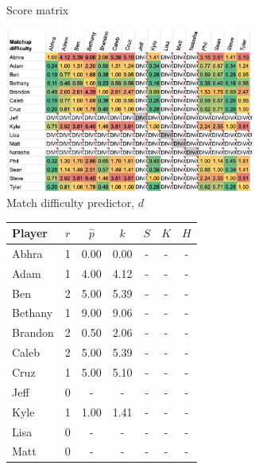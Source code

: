 \documentclass[letterpaper, 10 pt, conference]{ieeeconf}  %
\begin{document}
\begin{figure}[h!b]
\begin{subfigure}[ht]{0.4\textwidth}
                \caption{Score matrix}
        \end{subfigure}
        \begin{subfigure}[hb]{0.5\textwidth}
                \centering
                \includegraphics[width=0.9\textwidth]{fig/difficulty_3.png}
                \caption{Match difficulty predictor, $d$}
        \end{subfigure}
        \begin{subfigure}[hb]{0.4\textwidth}
                \footnotesize
                \centering
                \begin{tabular}{lccc|ccc}
                        \toprule
                        Player  & $r$   & $\hat{p}$ & $k$ & $S$ & $K$ & $H$ \\
                        \midrule
                        Abhra	& 1	& 0.00	& 0.00 & - & - & - \\
                        Adam	& 1	& 4.00	& 4.12 & - & - & - \\
                        Ben	& 2	& 5.00	& 5.39 & - & - & - \\
                        Bethany	& 1	& 9.00	& 9.06 & - & - & - \\
                        Brandon	& 2	& 0.50	& 2.06 & - & - & - \\
                        Caleb	& 2	& 5.00	& 5.39 & - & - & - \\
                        Cruz	& 1	& 5.00	& 5.10 & - & - & - \\
                        Jeff	& 0	& -  	& -    & - & - & - \\
                        Kyle	& 1	& 1.00	& 1.41 & - & - & - \\
                        Lisa	& 0	& -  	& -    & - & - & - \\
                        Matt	& 0	& -  	& -    & - & - & - \\

\end{tabular}
\end{subfigure}
\end{figure}
\end{document}
